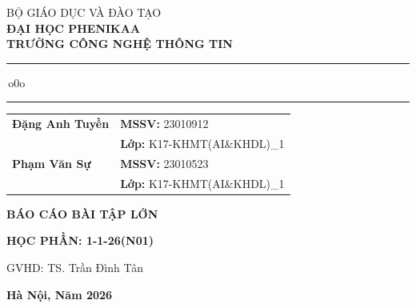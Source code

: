 \documentclass[12pt,a4paper]{article}
\theoremstyle{plain} %
\theoremstyle{plain} %
\theoremstyle{plain} %
\theoremstyle{nonumberplain}  %
\numberwithin{equation}{section}
\numberwithin{figure}{section}
\numberwithin{table}{section}
\begin{document}
\begin{titlepage}
\thispagestyle{empty}
\thisfancypage{\setlength{\fboxsep}{0.2cm}\setlength{\fboxrule}{1pt}\doublebox}{}
\begin{center}
	\large
	BỘ GIÁO DỤC VÀ ĐÀO TẠO\\
	\textbf{ĐẠI HỌC PHENIKAA}\\
	\textbf{TRƯỜNG CÔNG NGHỆ THÔNG TIN}\\[0.15cm]
	\rule{4cm}{0.4pt}\,o0o\,\rule{4cm}{0.4pt}
\end{center}
\vspace{1.5cm}
\begin{center}
	\normalsize
	\renewcommand{\arraystretch}{1.15}
	\begin{tabular}{@{}p{5.2cm}l@{}}
        \textbf{Đặng Anh Tuyền} & \textbf{MSSV:} 23010912 \\
                                & \textbf{Lớp:} K17-KHMT(AI\&KHDL)\_1 \\[0.25cm]
        \textbf{Phạm Văn Sự} & \textbf{MSSV:} 23010523 \\
                                & \textbf{Lớp:} K17-KHMT(AI\&KHDL)\_1 \\[0.25cm]
	\end{tabular}
\end{center}
\vspace{1.3cm}
\begin{center}
    \bf\Large {BÁO CÁO BÀI TẬP LỚN}
\end{center}
\begin{center}
    \bf\large {HỌC PHẦN:  1-1-26(N01)}
\end{center}
\vspace{0.65cm}
\begin{center}
	\bf\Large 
\end{center}
\vfill
\begin{center}
    GVHD: TS. Trần Đình Tân
\end{center}
\vfill
\begin{center}
    {\large\textbf{Hà Nội, Năm 2026}}
\end{center}
\vspace{0.25cm}
\end{titlepage}
\end{document}
